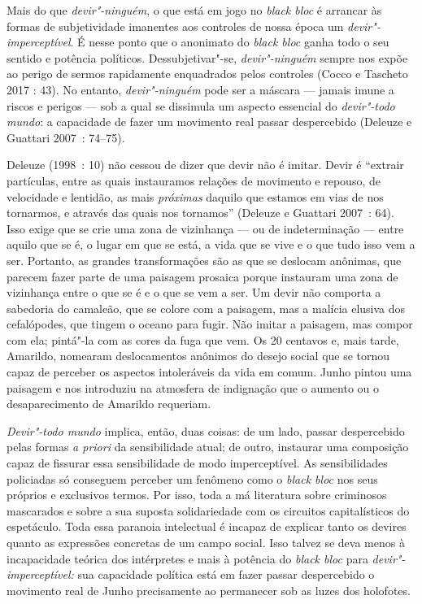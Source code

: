 Mais do que \emph{devir"-ninguém}, o que está em jogo no \emph{black bloc
}é arrancar às formas de subjetividade imanentes aos controles de nossa
época um \emph{devir"-imperceptível}. É nesse ponto que o anonimato do
\emph{black bloc} ganha todo o seu sentido e potência políticos.
Dessubjetivar"-se, \emph{devir"-ninguém} sempre nos expõe ao perigo de
sermos rapidamente enquadrados pelos controles (Cocco e Tascheto 2017 :
43). No entanto, \emph{devir"-ninguém} pode ser a máscara --- jamais imune
a riscos e perigos --- sob a qual se dissimula um aspecto essencial do
\emph{devir"-todo mundo}: a capacidade de fazer um movimento real passar
despercebido (Deleuze e Guattari 2007~: 74--75).

Deleuze (1998~: 10) não cessou de dizer que devir não é imitar. Devir é
``extrair partículas, entre as quais instauramos relações de movimento e
repouso, de velocidade e lentidão, as mais\emph{ próximas }daquilo que
estamos em vias de nos tornarmos, e através das quais nos tornamos''
(Deleuze e Guattari 2007~: 64). Isso exige que se crie uma zona de
vizinhança --- ou de indeterminação --- entre aquilo que se é, o lugar em
que se está, a vida que se vive e o que tudo isso vem a ser. Portanto,
as grandes transformações são as que se deslocam anônimas, que parecem
fazer parte de uma paisagem prosaica porque instauram uma zona de
vizinhança entre o que se é e o que se vem a ser. Um devir não comporta
a sabedoria do camaleão, que se colore com a paisagem, mas a malícia
elusiva dos cefalópodes, que tingem o oceano para fugir. Não imitar a
paisagem, mas compor com ela; pintá"-la com as cores da fuga que vem. Os
20 centavos e, mais tarde, Amarildo, nomearam deslocamentos anônimos do
desejo social que se tornou capaz de perceber os aspectos intoleráveis
da vida em comum. Junho pintou uma paisagem e nos introduziu na
atmosfera de indignação que o aumento ou o desaparecimento de Amarildo
requeriam.

\emph{Devir"-todo mundo} implica, então, duas coisas: de um lado, passar
despercebido pelas formas \emph{a priori} da sensibilidade atual; de
outro, instaurar uma composição capaz de fissurar essa sensibilidade de
modo imperceptível. As sensibilidades policiadas só conseguem perceber
um fenômeno como o \emph{black bloc} nos seus próprios e exclusivos
termos. Por isso, toda a má literatura sobre criminosos mascarados e
sobre a sua suposta solidariedade com os circuitos capitalísticos do
espetáculo. Toda essa paranoia intelectual é incapaz de explicar tanto
os devires quanto as expressões concretas de um campo social. Isso
talvez se deva menos à incapacidade teórica dos intérpretes e mais à
potência do \emph{black bloc }para \emph{devir"-imperceptível:} sua
capacidade política está em fazer passar despercebido o movimento real
de Junho precisamente ao permanecer sob as luzes dos holofotes.

